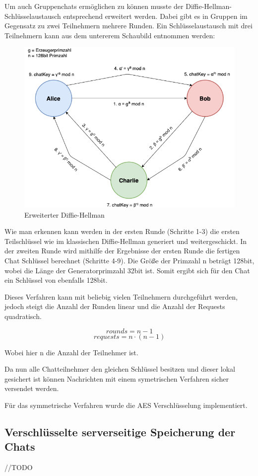 Um auch Gruppenchats ermöglichen zu können musste der 
Diffie-Hellman-Schlüsselaustausch entsprechend erweitert werden.
Dabei gibt es in Gruppen im Gegensatz zu zwei Teilnehmern 
mehrere Runden. Ein Schlüsselaustausch mit drei Teilnehmern kann
aus dem untererem Schaubild entnommen werden:

\begin{figure}[h]
  \centering
  \includegraphics[width=\textwidth]{dh.png}
  
  \caption{Erweiterter Diffie-Hellman}
  \label{}
\end{figure}

Wie man erkennen kann werden in der ersten Runde (Schritte 1-3)
die ersten Teilschlüssel wie im klassischen Diffie-Hellman generiert
und weitergeschickt. In der zweiten Runde wird mithilfe der Ergebnisse
der ersten Runde die fertigen Chat Schlüssel berechnet (Schritte 4-9).
Die Größe der Primzahl n beträgt 128bit, wobei die Länge der
Generatorprimzahl 32bit ist. Somit ergibt sich für den Chat ein 
Schlüssel von ebenfalls 128bit.

Dieses Verfahren kann mit beliebig vielen Teilnehmern durchgeführt
werden, jedoch steigt die Anzahl der Runden linear und die Anzahl der 
Requests quadratisch.

$$ rounds = n - 1 $$
$$ requests = n \cdot (n - 1) $$

Wobei hier n die Anzahl der Teilnehmer ist.

Da nun alle Chatteilnehmer den gleichen Schlüssel besitzen und dieser 
lokal gesichert ist können Nachrichten mit einem symetrischen Verfahren
sicher versendet werden.

Für das symmetrische Verfahren wurde die AES Verschlüsselung implementiert.

\subsection{Verschlüsselte serverseitige Speicherung der Chats}
//TODO

